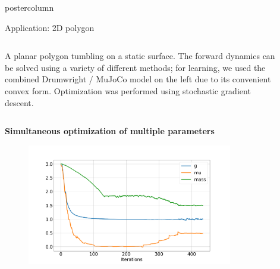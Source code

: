 \documentclass[final,hyperref={pdfpagelabels=false},5pt]{beamer}
\begin{document}
\begin{frame}
\begin{columns}
\begin{column}{.49\textwidth}
\begin{beamercolorbox}[center,wd=\textwidth]{postercolumn}
\begin{minipage}[T]{.95\textwidth}
{             \begin{block}{Application: 2D polygon}
             \centering
             \begin{columns}[c]
				\begin{column}{.6\hsize}
				\justify
                A planar polygon tumbling on a static surface. The forward dynamics can be solved using a variety of different methods; for learning, we used the combined Drumwright / MuJoCo model on the left due to its convenient convex form. Optimization was performed using stochastic gradient descent.
				\end{column}
				\begin{column}{.35\hsize}
				\centering
				\vspace{0ex}
    \begin{figure}
    \end{figure}
				\end{column}
				\end{columns}
              \vspace{1ex}
             \begin{center}
             	\textbf{Simultaneous optimization of multiple parameters}
             \end{center}
              \begin{figure}
              	\includegraphics[width=0.8\textwidth]{three_var_learn}
              \end{figure}
             \end{block}
            
}
\end{minipage}
\end{beamercolorbox}
\end{column}
\end{columns}
\end{frame}
\end{document}
